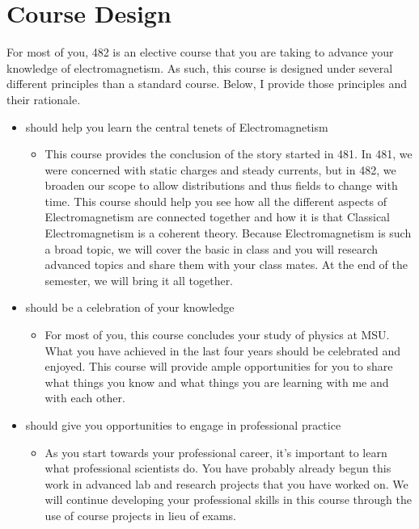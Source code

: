 \documentclass[letterpaper,10pt,english]{jupyterBook}
\begin{document}
\section{Course Design}
\label{\detokenize{content/0_course/design:course-design}}\label{\detokenize{content/0_course/design::doc}}
\sphinxAtStartPar
For most of you, 482 is an elective course that you are taking to advance your knowledge of electromagnetism. As such, this course is designed under several different principles than a standard course. Below, I provide those principles and their rationale.
\begin{itemize}
\item {} 
 should help you learn the central tenets of Electromagnetism
\begin{itemize}
\item {} 
\sphinxAtStartPar
This course provides the conclusion of the story started in 481. In 481, we were concerned with static charges and steady currents, but in 482, we broaden our scope to allow distributions and thus fields to change with time. This course should help you see how all the different aspects of Electromagnetism are connected together and how it is that Classical Electromagnetism is a coherent theory. Because Electromagnetism is such a broad topic, we will cover the basic in class and you will research advanced topics and share them with your class mates. At the end of the semester, we will bring it all together.

\end{itemize}

\item {} 
 should be a celebration of your knowledge
\begin{itemize}
\item {} 
\sphinxAtStartPar
For most of you, this course concludes your study of physics at MSU. What you have achieved in the last four years should be celebrated and enjoyed. This course will provide ample opportunities for you to share what things you know and what things you are learning with me and with each other.

\end{itemize}

\item {} 
 should give you opportunities to engage in professional practice
\begin{itemize}
\item {} 
\sphinxAtStartPar
As you start towards your professional career, it’s important to learn what professional scientists do. You have probably already begun this work in advanced lab and research projects that you have worked on. We will continue developing your professional skills in this course through the use of course projects in lieu of exams.


\end{itemize}
\end{itemize}
\end{document}
